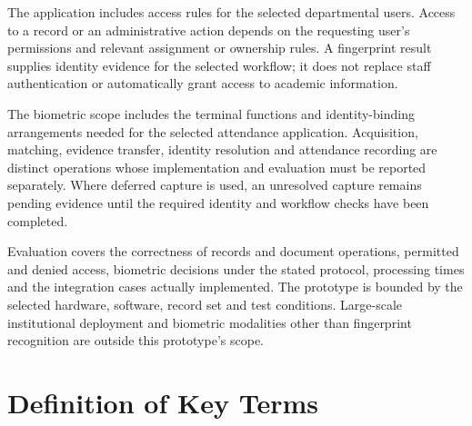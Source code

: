 The application includes access rules for the selected departmental users. Access to a record or an administrative action depends on the requesting user's permissions and relevant assignment or ownership rules. A fingerprint result supplies identity evidence for the selected workflow; it does not replace staff authentication or automatically grant access to academic information.

The biometric scope includes the terminal functions and identity-binding arrangements needed for the selected attendance application. Acquisition, matching, evidence transfer, identity resolution and attendance recording are distinct operations whose implementation and evaluation must be reported separately. Where deferred capture is used, an unresolved capture remains pending evidence until the required identity and workflow checks have been completed.

Evaluation covers the correctness of records and document operations, permitted and denied access, biometric decisions under the stated protocol, processing times and the integration cases actually implemented. The prototype is bounded by the selected hardware, software, record set and test conditions. Large-scale institutional deployment and biometric modalities other than fingerprint recognition are outside this prototype's scope.

\section{Definition of Key Terms}\label{sec:1-7}



